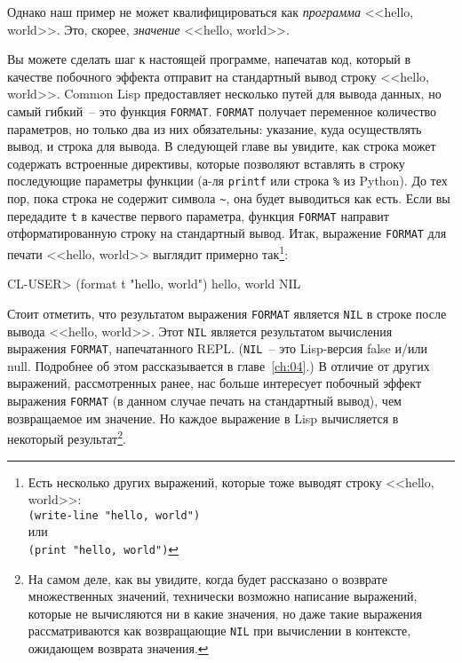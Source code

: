 Однако наш пример не может квалифицироваться как \emph{программа} <<hello, world>>.
Это, скорее, \emph{значение} <<hello, world>>.

Вы можете сделать шаг к настоящей программе, напечатав код, который в качестве побочного
эффекта отправит на стандартный вывод строку <<hello, world>>. Common Lisp предоставляет
несколько путей для вывода данных, но самый гибкий~-- это функция \lstinline{FORMAT}. \lstinline{FORMAT} получает
переменное количество параметров, но только два из них обязательны: указание, куда
осуществлять вывод, и строка для вывода. В следующей главе вы увидите, как строка может
содержать встроенные директивы, которые позволяют вставлять в строку последующие параметры
функции (а-ля \lstinline{printf} или строка \lstinline|%| из Python). До тех пор, пока строка
не содержит символа \lstinline|~|, она будет выводиться как есть. Если вы передадите \texttt{t} в
качестве первого параметра, функция \lstinline{FORMAT} направит отформатированную строку на
стандартный вывод. Итак, выражение \lstinline{FORMAT} для печати <<hello, world>> выглядит примерно
так\footnote{Есть несколько других выражений, которые тоже выводят строку <<hello, world>>:\\
  \lstinline{(write-line "hello, world")} \\
  или \\
  \lstinline{(print "hello, world")}}:

\begin{myverb}
CL-USER> (format t "hello, world")
hello, world
NIL
\end{myverb}

Стоит отметить, что результатом выражения \lstinline{FORMAT} является \lstinline{NIL} в строке после
вывода <<hello, world>>. Этот \lstinline{NIL} является результатом вычисления выражения \lstinline{FORMAT},
напечатанного REPL. (\lstinline{NIL}~-- это Lisp-версия false и/или null. Подробнее об этом
рассказывается в главе~\ref{ch:04}.) В отличие от других выражений, рассмотренных ранее, нас больше
интересует побочный эффект выражения \lstinline{FORMAT} (в данном случае печать на стандартный
вывод), чем возвращаемое им значение. Но каждое выражение в Lisp вычисляется в некоторый
результат\footnote{На самом деле, как вы увидите, когда будет рассказано о возврате
  множественных значений, технически возможно написание выражений, которые не вычисляются
  ни в какие значения, но даже такие выражения рассматриваются как возвращающие \lstinline{NIL} при
  вычислении в контексте, ожидающем возврата значения.}.

